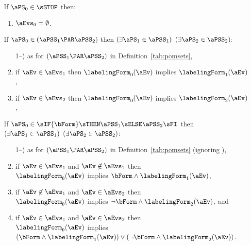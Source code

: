 \begin{definition}
  If $\aPS_0\in\sSTOP$ then:
  \begin{enumerate}
  \item $\aEvs_0 = \emptyset$.
  \end{enumerate}

  \noindent
  If $\aPS_0 \in (\aPSS_1\PAR\aPSS_2)$ then
  $(\exists\aPS_1\in\aPSS_1)$ $(\exists\aPS_2\in\aPSS_2)$:
  \begin{enumerate}
     \setcounter{enumi}{\value{pomsetParDisjointXount}}
  \item[1--\thepomsetParDisjointXount)] as for $(\aPSS_1\PAR\aPSS_2)$ in Definition~\ref{tab:pomsets},
  \item if $\aEv\in\aEvs_1$ then $\labelingForm_0(\aEv)$ implies $\labelingForm_1(\aEv)$,
  \item if $\aEv\in\aEvs_2$ then $\labelingForm_0(\aEv)$ implies $\labelingForm_2(\aEv)$,
    \setcounter{pomsetPreParXount}{\value{enumi}}
  \end{enumerate}

  \noindent
  If $\aPS_0 \in \sIF{\bForm}\sTHEN\aPSS_1\sELSE\aPSS_2\sFI$ then
  $(\exists\aPS_1\in\aPSS_1)$ $(\exists\aPS_2\in\aPSS_2)$:
  \begin{enumerate}
  \setcounter{enumi}{\value{pomsetParXount}}
  \item[1--\thepomsetParXount)] as for $(\aPSS_1\PAR\aPSS_2)$  in
    Definition~\ref{tab:pomsets} (ignoring \thepomsetParDisjointXount),
  \item if $\aEv\in\aEvs_1$ and $\aEv\not\in\aEvs_1$ then\\ $\labelingForm_0(\aEv)$ implies $\bForm\land\labelingForm_1(\aEv)$,
  \item if $\aEv\not\in\aEvs_1$ and $\aEv\in\aEvs_2$ then\\ $\labelingForm_0(\aEv)$ implies $\neg\bForm\land\labelingForm_2(\aEv)$, and
  \item if $\aEv\in\aEvs_1$ and $\aEv\in\aEvs_2$ then\\ $\labelingForm_0(\aEv)$ implies $(\bForm\land\labelingForm_1(\aEv))\lor(\neg\bForm\land\labelingForm_2(\aEv))$.
    \setcounter{pomsetPreIfXount}{\value{enumi}}
  \end{enumerate}


\end{definition}
